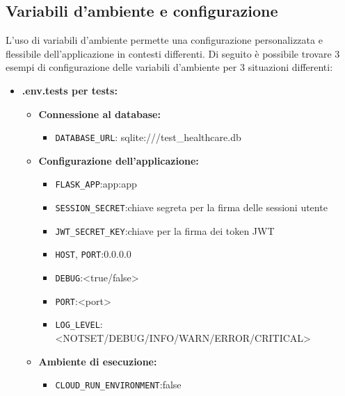 \documentclass[12pt,a4paper,oneside]{report}
\begin{document}
\subsection{Variabili d'ambiente e configurazione}
L'uso di variabili d'ambiente permette una configurazione personalizzata e flessibile dell'applicazione in contesti differenti.
Di seguito è possibile trovare 3 esempi di configurazione delle variabili d'ambiente per 3 situazioni differenti:
\begin{itemize}
    \item \textbf{.env.tests per tests:}
          \begin{itemize}
              \item \textbf{Connessione al database:}
                    \begin{itemize}
                        \item \texttt{DATABASE\_URL}: sqlite:///test\_healthcare.db
                    \end{itemize}

              \item \textbf{Configurazione dell'applicazione:}
                    \begin{itemize}
                        \item \texttt{FLASK\_APP}:app:app
                        \item \texttt{SESSION\_SECRET}:chiave segreta per la firma delle sessioni utente
                        \item \texttt{JWT\_SECRET\_KEY}:chiave per la firma dei token JWT
                        \item \texttt{HOST}, \texttt{PORT}:0.0.0.0
                        \item \texttt{DEBUG}:<true/false>
                        \item \texttt{PORT}:<port>
                        \item \texttt{LOG\_LEVEL}:<NOTSET/DEBUG/INFO/WARN/ERROR/CRITICAL>
                    \end{itemize}

              \item \textbf{Ambiente di esecuzione:}
                    \begin{itemize}
                        \item \texttt{CLOUD\_RUN\_ENVIRONMENT}:false
                    \end{itemize}
          \end{itemize}


\end{itemize}
\end{document}
